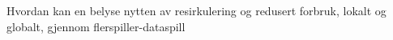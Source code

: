 Hvordan kan en belyse nytten av resirkulering og redusert forbruk,
lokalt og globalt, gjennom flerspiller-dataspill
